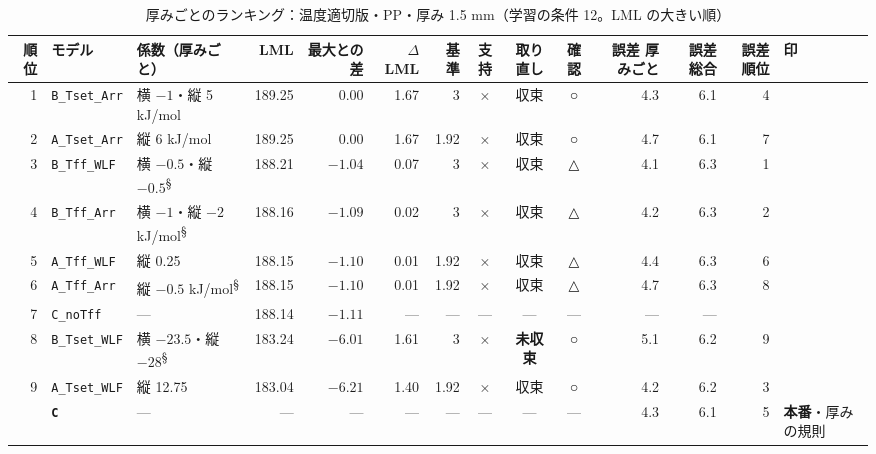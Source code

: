 \documentclass[paper=a4paper,landscape,fontsize=10pt,line_length=62zw,number_of_lines=34]{jlreq}
\let\origtextbf\textbf
\renewcommand{\textbf}[1]{\origtextbf{\gtfamily #1}}   %
\begin{document}
\begin{table}[H]\centering\footnotesize
\caption{厚みごとのランキング：温度適切版・PP・厚み 1.5 mm（学習の条件 12。LML の大きい順）}
\begin{tabular}{rlp{11\zw}rrrrccc rrrl}
\toprule
順位 & モデル & 係数（厚みごと） & LML & 最大との差 & $\Delta$LML & 基準 & 支持 & 取り直し & 確認 & 誤差 厚みごと & 誤差 総合 & 誤差順位 & 印 \\
\midrule
1 & \texttt{B\_\allowbreak{}Tset\_\allowbreak{}Arr} & 横 $-1$・縦 5 kJ/mol & 189.25 & 0.00 & 1.67 & 3 & × & 収束 & ○ & 4.3 & 6.1 & 4 &  \\
2 & \texttt{A\_\allowbreak{}Tset\_\allowbreak{}Arr} & 縦 6 kJ/mol & 189.25 & 0.00 & 1.67 & 1.92 & × & 収束 & ○ & 4.7 & 6.1 & 7 &  \\
3 & \texttt{B\_\allowbreak{}Tff\_\allowbreak{}WLF} & 横 $-0.5$・縦 $-0.5$\textsuperscript{§} & 188.21 & $-1.04$ & 0.07 & 3 & × & 収束 & △ & 4.1 & 6.3 & 1 &  \\
4 & \texttt{B\_\allowbreak{}Tff\_\allowbreak{}Arr} & 横 $-1$・縦 $-2$ kJ/mol\textsuperscript{§} & 188.16 & $-1.09$ & 0.02 & 3 & × & 収束 & △ & 4.2 & 6.3 & 2 &  \\
5 & \texttt{A\_\allowbreak{}Tff\_\allowbreak{}WLF} & 縦 0.25 & 188.15 & $-1.10$ & 0.01 & 1.92 & × & 収束 & △ & 4.4 & 6.3 & 6 &  \\
6 & \texttt{A\_\allowbreak{}Tff\_\allowbreak{}Arr} & 縦 $-0.5$ kJ/mol\textsuperscript{§} & 188.15 & $-1.10$ & 0.01 & 1.92 & × & 収束 & △ & 4.7 & 6.3 & 8 &  \\
7 & \texttt{C\_\allowbreak{}noTff} & --- & 188.14 & $-1.11$ & --- & --- & --- & --- & --- & --- & --- &  &  \\
8 & \texttt{B\_\allowbreak{}Tset\_\allowbreak{}WLF} & 横 $-23.5$・縦 $-28$\textsuperscript{§} & 183.24 & $-6.01$ & 1.61 & 3 & × & \textbf{未収束} & ○ & 5.1 & 6.2 & 9 &  \\
9 & \texttt{A\_\allowbreak{}Tset\_\allowbreak{}WLF} & 縦 12.75 & 183.04 & $-6.21$ & 1.40 & 1.92 & × & 収束 & ○ & 4.2 & 6.2 & 3 &  \\
 & \textbf{\texttt{C}} & --- & --- & --- & --- & --- & --- & --- & --- & 4.3 & 6.1 & 5 & \textbf{本番}・厚みの規則 \\
\bottomrule
\end{tabular}
\end{table}
\end{document}
